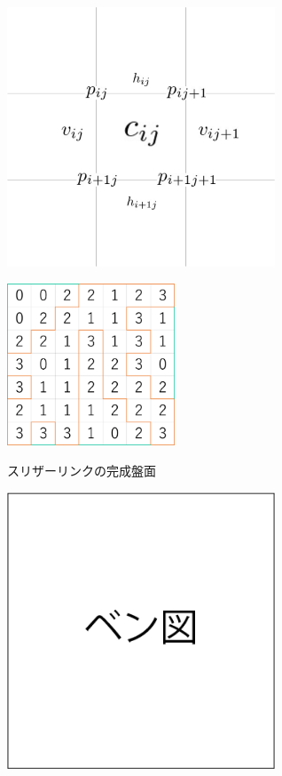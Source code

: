 \begin{clearpagefigure}
  \includegraphics[width=8cm,clip]{fig/define.png}
  \caption{}
  \label{fig:VariableAtBoard}
\end{clearpagefigure}

\begin{clearpagefigure}
  \includegraphics[width=5cm]{fig/slitherlink.png}
  \caption{スリザーリンクの完成盤面}
\end{clearpagefigure}

\begin{clearpagefigure}
  \includegraphics[width=8cm,clip]{fig/vennDiagram.png}
  \caption{}
  \label{fig:VennDiagram}
\end{clearpagefigure}

